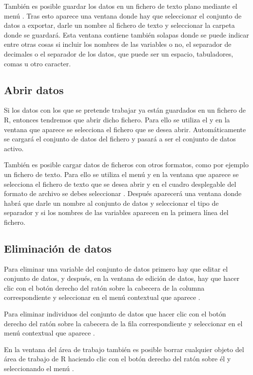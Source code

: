 También es posible guardar los datos en un fichero de texto plano mediante el menú .
Tras esto aparece una ventana donde hay que seleccionar el conjunto de datos a exportar, darle un nombre al fichero de
texto y seleccionar la carpeta donde se guardará.
Esta ventana contiene también solapas donde se puede indicar entre otras cosas si incluir los nombres de las variables o
no, el separador de decimales o el separador de los datos, que puede ser un espacio, tabuladores, comas u otro caracter.


\subsection{Abrir datos}
Si los datos con los que se pretende trabajar ya están guardados en un fichero de R, entonces tendremos que abrir dicho
fichero. Para ello se utiliza el  y en la ventana que aparece
se selecciona el fichero que se desea abrir.
Automáticamente se cargará el conjunto de datos del fichero y pasará a ser el conjunto de datos activo.

También es posible cargar datos de ficheros con otros formatos, como por ejemplo un fichero de texto.
Para ello se utiliza el menú  y en la ventana que aparece se
selecciona el fichero de texto que se desea abrir y en el cuadro desplegable del formato de archivo se debes seleccionar
.
Después aparecerá una ventana donde habrá que darle un nombre al conjunto de datos y seleccionar el tipo de separador y
si los nombres de las variables aparecen en la primera línea del fichero.


\subsection{Eliminación de datos}
Para eliminar una variable del conjunto de datos primero hay que editar el conjunto de datos, y después, en la ventana
de edición de datos, hay que hacer clic con el botón derecho del ratón sobre la cabecera de la columna correspondiente
y seleccionar en el menú contextual que aparece .

Para eliminar individuos del conjunto de datos que hacer clic con el botón derecho del ratón sobre la cabecera de la
fila correspondiente y seleccionar en el menú contextual que aparece .

En la ventana del área de trabajo también es posible borrar cualquier objeto del área de trabajo de R haciendo
clic con el botón derecho del ratón sobre él y seleccionando el menú .


